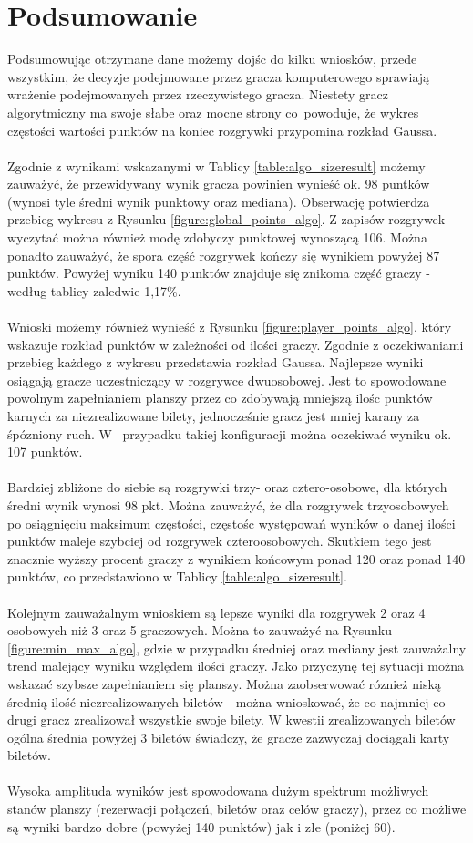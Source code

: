 \documentclass[12pt, oneside]{report}
\begin{document}
\section{Podsumowanie} 
Podsumowując otrzymane dane możemy dojśc do kilku wniosków, przede wszystkim, że decyzje podejmowane przez gracza komputerowego sprawiają wrażenie podejmowanych przez rzeczywistego gracza. Niestety gracz algorytmiczny ma swoje słabe oraz mocne strony co~powoduje, że wykres częstości wartości punktów na koniec rozgrywki przypomina rozkład Gaussa. \\ \\
Zgodnie z wynikami wskazanymi w Tablicy \ref{table:algo_sizeresult} możemy zauważyć, że przewidywany wynik gracza powinien wynieść ok. 98 puntków (wynosi tyle średni wynik punktowy oraz mediana). Obserwację potwierdza przebieg wykresu z Rysunku \ref{figure:global_points_algo}. Z zapisów rozgrywek wyczytać można również modę zdobyczy punktowej wynoszącą 106. Można  ponadto zauważyć, że spora część rozgrywek kończy się wynikiem powyżej 87 punktów. Powyżej wyniku 140 punktów znajduje się znikoma część graczy - według tablicy zaledwie 1,17\%. \\ \\ 
Wnioski możemy również wynieść z Rysunku \ref{figure:player_points_algo}, który wskazuje rozkład punktów w zależności od ilości graczy. Zgodnie z oczekiwaniami przebieg każdego z wykresu przedstawia rozkład Gaussa. Najlepsze wyniki osiągają gracze uczestniczący w rozgrywce dwuosobowej. Jest to spowodowane powolnym zapełnianiem planszy przez co zdobywają mniejszą ilośc punktów karnych za niezrealizowane bilety, jednocześnie gracz jest mniej karany za śpózniony ruch. W~ przypadku takiej konfiguracji można oczekiwać wyniku ok. 107 punktów. \\ \\ 
Bardziej zbliżone do siebie są rozgrywki trzy- oraz cztero-osobowe, dla których średni wynik wynosi 98 pkt. Można zauważyć, że dla rozgrywek trzyosobowych po osiągnięciu maksimum częstości, częstośc występowań wyników o danej ilości punktów maleje szybciej od rozgrywek czteroosobowych. Skutkiem tego jest znacznie wyższy procent graczy z wynikiem końcowym ponad 120 oraz ponad 140 punktów, co przedstawiono w Tablicy \ref{table:algo_sizeresult}. \\ \\
Kolejnym zauważalnym wnioskiem są lepsze wyniki dla rozgrywek 2 oraz 4 osobowych niż 3 oraz 5 graczowych. Można to zauważyć na Rysunku \ref{figure:min_max_algo}, gdzie w przypadku średniej oraz mediany jest zauważalny trend malejący wyniku względem ilości graczy. Jako przyczynę tej sytuacji można wskazać szybsze zapełnianiem się planszy. Można zaobserwować róznież niską średnią ilość niezrealizowanych biletów - można wnioskować, że co najmniej co drugi gracz zrealizował wszystkie swoje bilety. W kwestii zrealizowanych biletów ogólna średnia powyżej 3 biletów świadczy, że gracze zazwyczaj dociągali karty biletów. \\ \\
Wysoka amplituda wyników jest spowodowana dużym spektrum możliwych stanów planszy (rezerwacji połączeń, biletów oraz celów graczy), przez co możliwe są wyniki bardzo dobre (powyżej 140 punktów) jak i złe (poniżej 60). 
\end{document}
